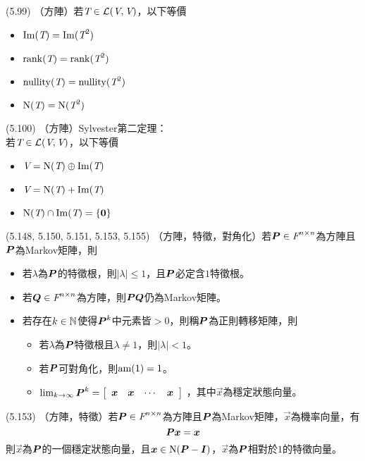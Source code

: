 \item \begin{theorem}{(5.99)} （方陣）若$\textit{T} \in \mathcal{L}(\textit{V}, \textit{V})$，以下等價
	\begin{itemize}
		\item $\operatorname{Im}(\textit{T}) = \operatorname{Im}(\textit{T}^2)$
		\item $\operatorname{rank}(\textit{T}) = \operatorname{rank}(\textit{T}^2)$
		\item $\operatorname{nullity}(\textit{T}) = \operatorname{nullity}(\textit{T}^2)$
		\item $\operatorname{N}(\textit{T}) = \operatorname{N}(\textit{T}^2)$
	\end{itemize}
\end{theorem}

\item \begin{theorem}{(5.100)} （方陣）Sylvester第二定理： \\
	若$\textit{T} \in \mathcal{L}(\textit{V}, \textit{V})$，以下等價
	\begin{itemize}
		\item $\textit{V} = \operatorname{N}(\textit{T}) \oplus \operatorname{Im}(\textit{T})$
		\item $\textit{V} = \operatorname{N}(\textit{T}) + \operatorname{Im}(\textit{T})$
		\item $\operatorname{N}(\textit{T}) \cap \operatorname{Im}(\textit{T}) = \{\boldsymbol{0}\}$
	\end{itemize}
\end{theorem}

\item \begin{theorem}{(5.148, 5.150, 5.151, 5.153, 5.155)} （方陣，特徵，對角化）若$\boldsymbol{P} \in \textit{F}^{n \times n}$為方陣且$\boldsymbol{P}$為Markov矩陣，則
	\begin{itemize}
		\item 若$\lambda$為$\boldsymbol{P}$的特徵根，則$|\lambda| \le 1$，且$\boldsymbol{P}$必定含$1$特徵根。
		\item 若$\boldsymbol{Q} \in \textit{F}^{n \times n}$為方陣，則$\boldsymbol{PQ}$仍為Markov矩陣。
		\item 若存在$k \in \mathbb{N}$使得$\boldsymbol{P}^k$中元素皆$> 0$，則稱$\boldsymbol{P}$為正則轉移矩陣，則
		\begin{itemize}
			\item 若$\lambda$為$\boldsymbol{P}$特徵根且$\lambda \neq 1$，則$|\lambda| < 1$。
			\item 若$\boldsymbol{P}$可對角化，則$\operatorname{am}(1) = 1$。
			\item $\lim_{k \rightarrow \infty} \boldsymbol{P}^k = 
			{\left[ 
			\begin{array}{cccc}
				\boldsymbol{x} & \boldsymbol{x} & \cdots & \boldsymbol{x}
			\end{array} 
			\right]}$
			，其中$\vec{x}$為穩定狀態向量。
		\end{itemize}
	\end{itemize}
\end{theorem}

\item \begin{theorem}{(5.153)} （方陣，特徵）若$\boldsymbol{P} \in \textit{F}^{n \times n}$為方陣且$\boldsymbol{P}$為Markov矩陣，$\vec{x}$為機率向量，有
	\begin{equation}
		\boldsymbol{P}\boldsymbol{x} = \boldsymbol{x}
	\end{equation}
	則$\vec{x}$為$\boldsymbol{P}$的一個穩定狀態向量，且$\boldsymbol{x} \in \operatorname{N}(\boldsymbol{P} - \boldsymbol{I})$，$\vec{x}$為$\boldsymbol{P}$相對於$1$的特徵向量。
\end{theorem}
